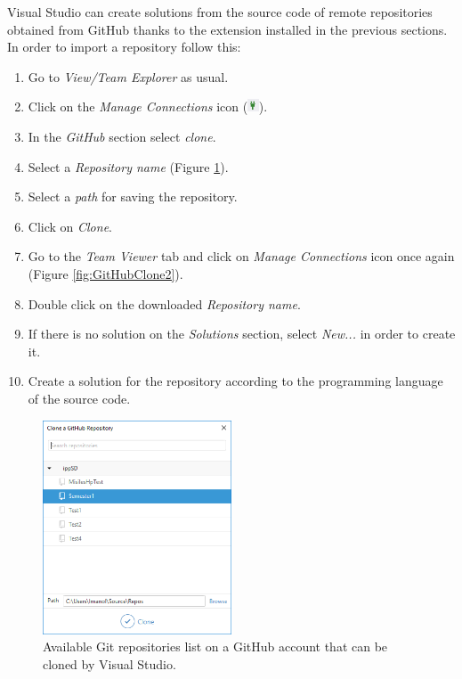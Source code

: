 Visual Studio can create solutions from the source code of remote repositories obtained from GitHub thanks to the extension installed in the previous sections. In order to import a repository follow this:

\begin{enumerate}
	\item Go to \textit{View/Team Explorer} as usual.
	\item Click on the \textit{Manage Connections} icon (\includegraphics[height=11pt]{./Figures/Connect.png}).
	\item In the \textit{GitHub} section select \textit{clone}.
	\item Select a \textit{Repository name} (Figure \ref{fig:GitHubClone1}).
	\item Select a \textit{path} for saving the repository.
	\item Click on \textit{Clone}.
	\item Go to the \textit{Team Viewer} tab and click on \textit{Manage Connections} icon once again (Figure \ref{fig:GitHubClone2}).
	\item Double click on the downloaded \textit{Repository name}.
	\item If there is no solution on the \textit{Solutions} section, select \textit{New...} in order to create it.
	\item Create a solution for the repository according to the programming language of the source code.
\end{enumerate}

\begin{figure}[H]
	\centering
	\includegraphics[width=0.5\textwidth]{Figures/GHC1.png}
	\caption{Available Git repositories list on a GitHub account that can be cloned by Visual Studio.}
	\label{fig:GitHubClone1}
\end{figure}

